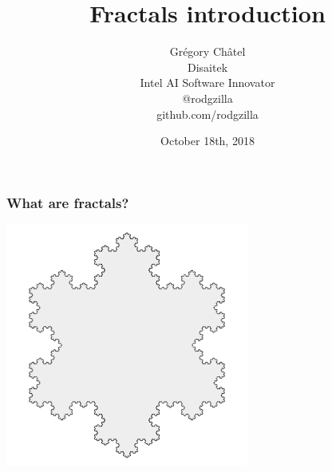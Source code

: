 \documentclass[10pt]{beamer}
\title{Fractals introduction}
\author[G. Châtel]{Grégory Châtel\\\vspace{0.3cm}Disaitek\\Intel AI Software Innovator\\\vspace{0.3cm}@rodgzilla\\github.com/rodgzilla}
\date{October 18th, 2018}
\begin{document}
\begin{frame}

  \maketitle

\end{frame}

\begin{frame}

  \frametitle{What are fractals?}

  \begin{center}
    \includegraphics[width = 8cm]{images/koch_snowflake.png}
  \end{center}

\end{frame}
\end{document}
